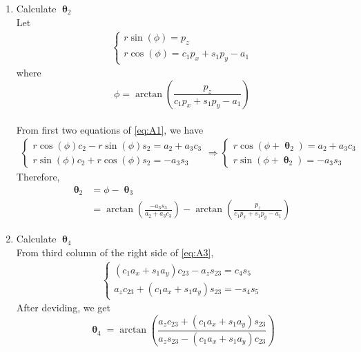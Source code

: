 \documentclass[12pt]{article}
\DeclareMathOperator{\Th}{\mathbf{\theta}}
\begin{document}
\begin{enumerate}
  \item Calculate $\Th_2$\\
    Let
    \begin{align*}
      \begin{cases}
        r\sin(\phi) = p_z\\
        r\cos(\phi) = c_1p_x + s_1p_y - a_1
      \end{cases}
    \end{align*} where
    $$\phi = \arctan(\frac{p_z}{c_1p_x + s_1p_y - a_1})$$\\
    From first two equations of \ref{eq:A1}, we have
    \begin{align*}
      \begin{cases}
        r\cos(\phi)c_2 - r\sin(\phi)s_2 = a_2 + a_3c_3\\
        r\sin(\phi)c_2 + r\cos(\phi)s_2 = -a_3s_3
      \end{cases}
      \Rightarrow
      \begin{cases}
        r\cos(\phi + \Th_2) = a_2 + a_3c_3\\
        r\sin(\phi + \Th_2) = -a_3s_3
      \end{cases}
    \end{align*}
    Therefore,
    \begin{align*}
      \Th_2 & = \phi - \Th_3\\
            & = \arctan(\frac{-a_3s_3}{a_2 + a_3c_3}) - \arctan(\frac{p_z}{c_1p_x + s_1p_y - a_1})
    \end{align*}

  \item Calculate $\Th_4$\\
    From third column of the right side of \ref{eq:A3},
    \begin{align*}
      \begin{cases}
        (c_1a_x + s_1a_y)c_{23} - a_zs_{23} = c_4s_5\\
        a_zc_{23} + (c_1a_x + s_1a_y)s_{23}= -s_4s_5
      \end{cases}
    \end{align*}
    After deviding, we get
    $$\Th_4 = \arctan\left(\frac{a_zc_{23} + (c_1a_x + s_1a_y)s_{23}}{a_zs_{23} - (c_1a_x + s_1a_y)c_{23}}\right)$$


\end{enumerate}
\end{document}
